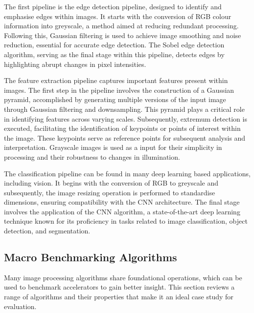 The first pipeline is the edge detection pipeline, designed to identify and emphasise edges within images. It starts with the conversion of RGB colour information into greyscale, a method aimed at reducing redundant processing. Following this, Gaussian filtering is used to achieve image smoothing and noise reduction, essential for accurate edge detection. The Sobel edge detection algorithm, serving as the final stage within this pipeline, detects edges by highlighting abrupt changes in pixel intensities.

The feature extraction pipeline captures important features present within images. The first step in the pipeline involves the construction of a Gaussian pyramid, accomplished by generating multiple versions of the input image through Gaussian filtering and downsampling. This pyramid plays a critical role in identifying features across varying scales. Subsequently, extremum detection is executed, facilitating the identification of keypoints or points of interest within the image. These keypoints serve as reference points for subsequent analysis and interpretation. Grayscale images is used as a input for their simplicity in processing and their robustness to changes in illumination.

The classification pipeline can be found in many deep learning based applications, including vision. It begins with the conversion of RGB to greyscale and subsequently, the image resizing operation is performed to standardise dimensions, ensuring compatibility with the CNN architecture. The final stage involves the application of the CNN algorithm, a state-of-the-art deep learning technique known for its proficiency in tasks related to image classification, object detection, and segmentation.


\subsection{Macro Benchmarking Algorithms}
Many image processing algorithms share foundational operations, which can be used to benchmark accelerators to gain better insight. This section reviews a range of algorithms and their properties that make it an ideal case study for evaluation.


